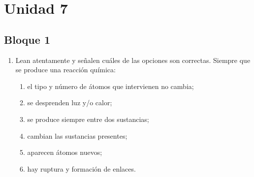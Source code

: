 \documentclass[../Práctica.root.tex]{subfiles}
\begin{document}
\section{Unidad 7}
\subsection{Bloque 1}
\begin{enumerate}
    \item Lean atentamente y señalen cuáles de las opciones son correctas.
          Siempre que se produce una reacción química:
          \begin{enumerate}
              \item el tipo y número de átomos que intervienen no cambia; \checkmark
              \item se desprenden luz y/o calor;
              \item se produce siempre entre dos sustancias;
              \item cambian las sustancias presentes; \checkmark
              \item aparecen átomos nuevos;
              \item hay ruptura y formación de enlaces. \checkmark
          \end{enumerate}


\end{enumerate}
\end{document}
